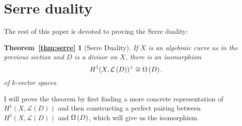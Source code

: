 \section{Serre duality}
The rest of this paper is devoted to proving the Serre duality:
\newtheorem*{thm:serre}{Theorem~\ref{thm:serre}}
\begin{thm:serre}[Serre Duality]
  If $X$ is an algebraic curve as in the previous section
  and $D$ is a divisor on $X$, there is an isomorphism
  \[
    H^1(X,\mathcal{L}\left(D\right))^{\vee}\cong \Omega\left(D\right).
  \]
  of $k$-vector spaces.
\end{thm:serre}
I will prove the theorem by first finding a more concrete representation of
$H^{1}(X,\mathcal{L}(D))$ and then constructing a perfect pairing between
$H^{1}(X,\mathcal{L}(D))$ and $\Omega\left(D\right)$,
which will give us the isomorphism.

